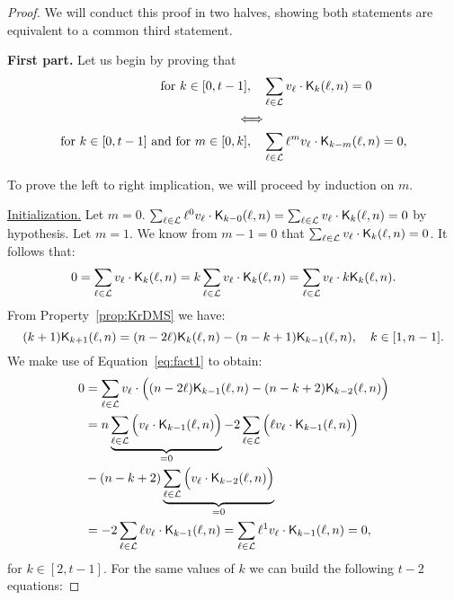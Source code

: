 \begin{proof}
    We will conduct this proof in two halves, showing both statements are equivalent to a common third statement.

    \textbf{First part.}   Let us begin by proving that
    \begin{equation*}
        \begin{split}
            \text{for } k \in [0, t-1], \quad &\sum_{\ell \in \mathcal{L}} v_\ell \cdot \mathsf{K}_{k}(\ell,n) = 0\\
            \Longleftrightarrow\\
            \text{for } k \in [0, t-1] \text{ and for } m \in [0, k], \quad &\sum_{\ell \in \mathcal{L}} \ell^mv_\ell \cdot \mathsf{K}_{k-m}(\ell,n) = 0,
        \end{split}
    \end{equation*}

    To prove the left to right implication, we will proceed by induction on $m$.

    \underline{Initialization.} 
    Let $m = 0$. $\sum_{\ell \in \mathcal{L}} \ell^0v_\ell \cdot \mathsf{K}_{k-0}(\ell,n) = \sum_{\ell \in \mathcal{L}} v_\ell \cdot \mathsf{K}_{k}(\ell,n) = 0$ by hypothesis.
    Let $m = 1$. 
    We know from $m - 1 = 0$ that $\sum_{\ell \in \mathcal{L}} v_\ell \cdot \mathsf{K}_{k}(\ell,n) = 0$. It follows that:
    $$
    0 = \sum_{\ell \in \mathcal{L}} v_\ell \cdot \mathsf{K}_{k}(\ell,n) = k\sum_{\ell \in \mathcal{L}} v_\ell \cdot \mathsf{K}_{k}(\ell,n) = \sum_{\ell \in \mathcal{L}} v_\ell \cdot k\mathsf{K}_{k}(\ell,n).
    $$
From Property~\ref{prop:KrDMS} we have:
    \begin{equation}\label{eq:fact1}
        (k+1)\mathsf{K}_{k+1}(\ell,n) = (n-2\ell)\mathsf{K}_{k}(\ell,n) - (n-k+1)\mathsf{K}_{k-1}(\ell,n), \quad k \in [1, n-1].
    \end{equation}
    We make use of Equation~\ref{eq:fact1} to obtain:
    \begin{equation*}
    \begin{split}
        0 &= \sum_{\ell \in \mathcal{L}} v_\ell \cdot \Big( (n - 2\ell)\mathsf{K}_{k-1}(\ell,n) - (n - k+2)\mathsf{K}_{k-2}(\ell,n) \Big)\\
        & = n \underbrace{\sum_{\ell \in \mathcal{L}} \Big( v_\ell \cdot \mathsf{K}_{k-1}(\ell,n) \Big)}_{=0} - 2\sum_{\ell \in \mathcal{L}} \Big( \ell v_\ell \cdot \mathsf{K}_{k-1}(\ell,n) \Big)\\& - (n-k+2)\underbrace{\sum_{\ell \in \mathcal{L}} \Big( v_\ell \cdot \mathsf{K}_{k-2}(\ell,n) \Big)}_{=0}\\
        &= -2\sum_{\ell \in \mathcal{L}} \ell v_\ell \cdot \mathsf{K}_{k-1}(\ell,n) = \sum_{\ell \in \mathcal{L}} \ell^1v_\ell \cdot \mathsf{K}_{k-1}(\ell,n) = 0,
    \end{split}
    \end{equation*}
    for $k \in [2, t-1]$. For the same values of $k$ we can build the following $t-2$ equations:


\end{proof}
